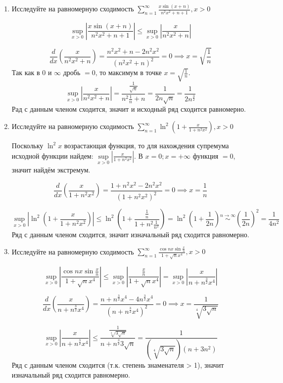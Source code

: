 \documentclass{article}
\begin{document}
\begin{large}
\begin{enumerate}
\item Исследуйте на равномерную сходимость $ \sum\limits_{n=1}^{\infty} \frac{x \sin(x+n)}{n^2x^2 + n + 1}, x > 0 $

$$ \sup_{x>0} \left| \frac{x \sin(x+n)}{n^2x^2 + n + 1} \right| \leq \sup_{x>0} \left| \frac{x}{n^2x^2 + n} \right| $$

$$ \frac{d}{dx} \left( \frac{x}{n^2x^2 + n} \right) = \frac{n^2x^2 + n - 2n^2x^2}{(n^2x^2 + n)^2} = 0 \implies x = \sqrt{\frac{1}{n}}$$
Так как в $0$ и $\infty$ дробь $= 0$, то максимум в точке $x = \sqrt{\frac{1}{n}}$.
$$ \sup_{x>0} \left| \frac{x}{n^2x^2 + n} \right| = \frac{\frac{1}{\sqrt{n}}}{n^2 \frac{1}{n} + n} = \frac{1}{2n\sqrt{n}} = \frac{1}{2 n^{\frac{3}{2}}}$$
Рад с данным членом сходится, значит и исходный ряд сходится равномерно.

\item Исследуйте на равномерную сходимость $ \sum\limits_{n=1}^{\infty} \ln^{2} \left( 1 + \frac{x}{1+n^2 x^2} \right), x > 0 $

Поскольку $\ln^2 x$ возрастающая функция, то для нахождения супремума исходной функции найдем: $ \sup\limits_{x>0} \left| \frac{x}{1+n^2 x^2} \right| $. В $x = 0; x = +\infty$ функция $= 0$, значит найдём экстремум.

$$ \frac{d}{dx} \left( \frac{x}{1+n^2 x^2} \right)  = \frac{1+n^2 x^2 - 2n^2 x^2}{(1+n^2 x^2)^2} = 0 \implies x = \frac{1}{n} $$

$$ \sup\limits_{x>0} \left| \ln^{2} \left( 1 + \frac{x}{1+n^2 x^2} \right) \right| \leq \ln^2 \left( 1+ \frac{\frac{1}{n}}{1 + n^2 \frac{1}{n^2}} \right) = \ln^2 \left( 1 + \frac{1}{2n} \right) \stackrel{n\to\infty}{\sim} \left( \frac{1}{2n} \right)^2 = \frac{1}{4n^2} $$
Ряд с данным членом сходится, значит изначальный ряд сходится равномерно.

\item Исследуйте на равномерную сходимость $ \sum\limits_{n=1}^{\infty} \frac{\cos nx \sin \frac{x}{n}}{1 + \sqrt{n}x^4}, x > 0 $

$$ \sup_{x>0} \left| \frac{\cos nx \sin \frac{x}{n}}{1 + \sqrt{n}x^4} \right| \leq \sup_{x>0} \left| \frac{\frac{x}{n}}{1 + \sqrt{n}x^4} \right| = \sup_{x>0} \left| \frac{x}{n + n^{\frac{3}{2}}x^4} \right| $$

$$ \frac{d}{dx} \left( \frac{x}{n + n^{\frac{3}{2}}x^4} \right) = \frac{n + n^{\frac{3}{2}}x^4 - 4n^{\frac{3}{2}}x^4}{(n + n^{\frac{3}{2}}x^4)^2} = 0 \implies x = \frac{1}{\sqrt[4]{3\sqrt{n}}} $$

$$ \sup_{x>0} \left| \frac{x}{n + n^{\frac{3}{2}}x^4} \right| \leq \frac{\frac{1}{\sqrt[4]{3\sqrt{n}}}}{n + n^{\frac{3}{2}} 3\sqrt{n}} = \frac{1}{(\sqrt[4]{3\sqrt{n}})(n + 3n^2)}$$
Ряд с данным членом сходится (т.к. степень знаменателя > 1), значит изначальный ряд сходится равномерно.


\end{enumerate}
\end{large}
\end{document}
